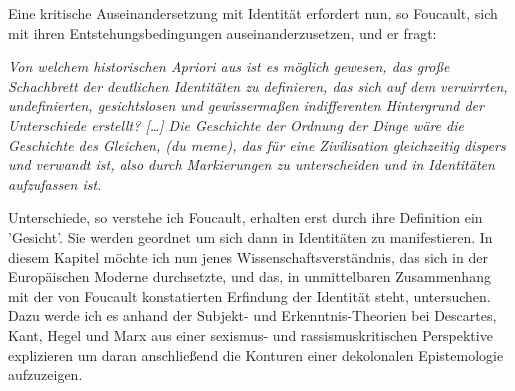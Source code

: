 \noindent Eine kritische
Auseinandersetzung mit Identität erfordert nun, so Foucault, sich mit ihren
Entstehungsbedingungen auseinanderzusetzen, und er fragt: 
\begin{myenv} \textit{
\glqq    Von welchem historischen Apriori aus ist es möglich gewesen, das große
    Schachbrett der deutlichen Identitäten zu definieren, das sich auf dem
    verwirrten, undefinierten, gesichtslosen und gewissermaßen indifferenten
    Hintergrund der Unterschiede erstellt? […] Die Geschichte der Ordnung der
    Dinge wäre die Geschichte des Gleichen, (du meme), das für eine Zivilisation
    gleichzeitig dispers und verwandt ist, also durch Markierungen zu
    unterscheiden und in Identitäten aufzufassen ist.\grqq \footnotemark
   }
\end{myenv}
Unterschiede, so verstehe ich Foucault, erhalten erst durch ihre Definition ein
'Gesicht'. Sie werden geordnet um sich dann in Identitäten zu manifestieren. In
diesem Kapitel möchte ich nun jenes Wissenschaftsverständnis, das sich in der
Europäischen Moderne durchsetzte, und das, in unmittelbaren Zusammenhang mit der
von Foucault konstatierten Erfindung der Identität steht, untersuchen. Dazu
werde ich es anhand der Subjekt- und Erkenntnis-Theorien bei Descartes, Kant,
Hegel und Marx aus einer sexismus- und rassismuskritischen Perspektive
explizieren um daran anschließend die Konturen einer dekolonalen Epistemologie
aufzuzeigen.\\

